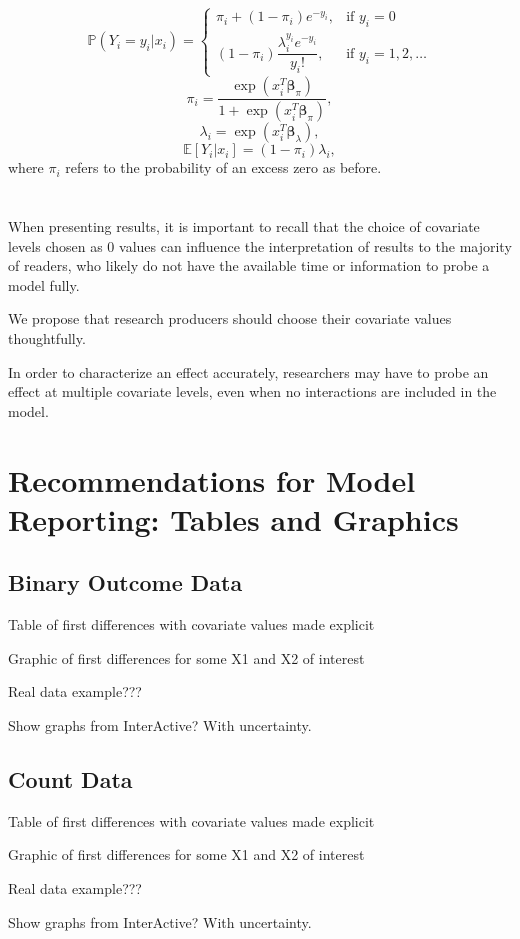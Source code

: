 \documentclass[jou, apacite]{apa6}
\begin{document}
\begin{equation} \label{zip1}
\mathbb{P}(Y_i = y_i|x_i) =
  \begin{cases}
    \pi_i + (1 - \pi_i)e^{-y_i}, & \text{if } y_i = 0 \\
    (1 - \pi_i) \dfrac{\lambda_i^{y_i}e^{-y_i}}{y_i!}, & \text{if } y_i = 1, 2, \dots
  \end{cases}
\end{equation}
\begin{equation} \label{zip2}
\pi_i = \dfrac{\exp (x_i^T \bm{\beta}_{\pi})}{1 + \exp (x_i^T \bm{\beta}_{\pi})},
\end{equation}
\begin{equation} \label{zip3}
\lambda_i = \exp (x_i^T \bm{\beta}_{\lambda}),
\end{equation}
\begin{equation} \label{zip4}
\mathbb{E}[Y_i|x_i] = (1 - \pi_i)\lambda_i,
\end{equation}
where $\pi_i$ refers to the probability of an excess zero as before.


\section{}
When presenting results, it is important to recall that the choice of covariate levels chosen as 0 values can influence the interpretation of results to the majority of readers, who likely do not have the available time or information to probe a model fully. 

We propose that research producers should choose their covariate values thoughtfully. 

In order to characterize an effect accurately, researchers may have to probe an effect at multiple covariate levels, even when no interactions are included in the model.

\section{Recommendations for Model Reporting: Tables and Graphics}
\subsection{Binary Outcome Data}
Table of first differences with covariate values made explicit

Graphic of first differences for some X1 and X2 of interest	

Real data example???

Show graphs from InterActive? With uncertainty.

\subsection{Count Data}
Table of first differences with covariate values made explicit

Graphic of first differences for some X1 and X2 of interest

Real data example???

Show graphs from InterActive? With uncertainty.
\end{document}
